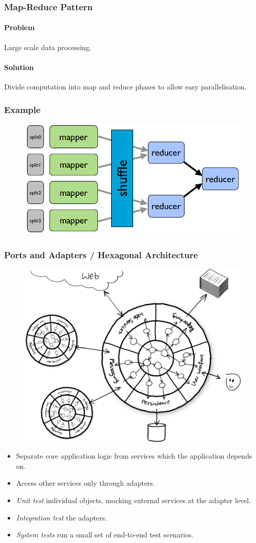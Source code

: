 \documentclass[twocolumn,english]{article}
\begin{document}
\subsubsection{Map-Reduce Pattern}

\paragraph{Problem}

Large scale data processing.

\paragraph{Solution}

Divide computation into map and reduce phases to allow easy parallelisation.

\subsubsection*{Example}

\begin{figure}[H]
\centering{}\includegraphics[width=0.4\columnwidth]{img/mapreduce}
\end{figure}

\subsubsection{Ports and Adapters / Hexagonal Architecture}

\begin{figure}[H]
\centering{}\includegraphics[width=0.5\columnwidth]{img/hexagonal}
\end{figure}
\begin{itemize}
\item Separate core application logic from services which the application
depends on.
\item Access other services only through adapters.
\item \emph{Unit test} individual objects, mocking external services at
the adapter level.
\item \emph{Integration test} the adapters.
\item \emph{System tests} run a small set of end-to-end test scenarios.
\end{itemize}
\end{document}
